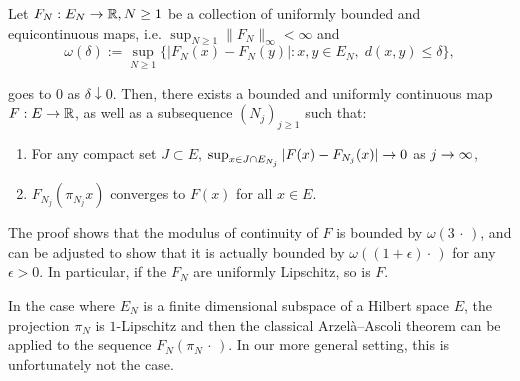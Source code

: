 \documentclass[AHL,Unicode,longabstracts]{cedram}
\theoremstyle{plain}
\newcommand{\R}{\mathbb{R}}
\renewcommand*{\to}{\mathchoice{\longrightarrow}{\rightarrow}{\rightarrow}{\rightarrow}}
\begin{document}
\begin{theo}\label{Th:Arzela}
Let $F_N:E_N\to\R, N\ge1$ be a collection of uniformly bounded and equicontinuous maps, i.e. $\sup_{N\geq 1} \|F_N\|_{\infty}<\infty$ and
\begin{equation}
\omega(\delta):= \sup_{N\geq 1}\big\{|F_N(x)-F_N(y)|: x,y\in E_N,\; d(x,y)\leq \delta\big\},
\end{equation}
\pagebreak{}

\noindent
goes to $0$ as $\delta \downarrow 0$. Then, there exists a bounded and uniformly continuous map $F:E\to\R$, as well as a subsequence $(N_j)_{j\geq 1}$ such that:
\begin{enumerate}
\item For any compact set $J\subset E$, $\sup_{x\in J\cap E_{N_j}} |F(x)-F_{N_j}(x)| \to 0$ as $j\to\infty$,
\item $F_{N_j}(\pi_{N_j} x)$ converges to $F(x)$ for all $x \in E$.
\end{enumerate}
\end{theo}
\begin{rema}
The proof shows that the modulus of continuity of $F$ is bounded by $\omega(3\,\cdot\,)$, and can be adjusted to show that it is actually bounded by $\omega((1+\epsilon)\cdot\,)$ for any $\epsilon>0$. In particular, if the $F_N$ are uniformly Lipschitz, so is $F$.
\end{rema}
\begin{rema}
In the case where $E_N$ is a finite dimensional subspace of a Hilbert space $E$, the projection $\pi_N$ is $1$-Lipschitz and then the classical Arzelà--Ascoli theorem can be applied to the sequence $F_N(\pi_N\,\cdot\,)$. In our more general setting, this is unfortunately not the case.
\end{rema}
\end{document}
